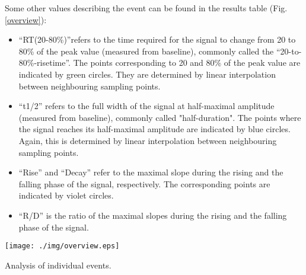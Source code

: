 Some other values describing the event can be found in the results table (Fig. \ref{overview}):
\begin{itemize}
  \item {}``RT(20-80\%)''refers to the time required for the signal to change from 20 to 80\% of the peak value (measured from baseline), commonly called the ``20-to-80\%-risetime''.  The points corresponding to 20 and 80\% of the peak value are indicated by green circles. They are determined by linear interpolation between neighbouring sampling points.
  \item {}``t1/2'' refers to the full width of the signal at half-maximal amplitude (measured from baseline), commonly called "half-duration". The points where the signal reaches its half-maximal amplitude are indicated by blue circles. Again, this is determined by linear interpolation between neighbouring sampling points. 
  \item ``Rise'' and ``Decay'' refer to the maximal slope during the rising and the falling phase of the signal, respectively. The corresponding points are indicated by violet circles.
  \item {}``R/D'' is the ratio of the maximal slopes during the rising and the falling phase of the signal.
\end{itemize}

  \begin{myfigure}[ht]
    \begin{center}
      \texttt{[image: ./img/overview.eps]}
    \end{center}
    \caption{Analysis of individual events.}
    \label{overview}
  \end{myfigure}

